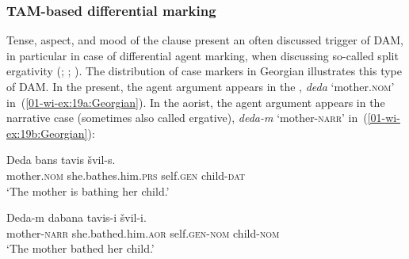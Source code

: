 \documentclass[output=paper]{LSP/langsci}
\begin{document}
\subsubsection{TAM-based differential marking}
\label{01-wi-sec:2.2.2-TAM-based}

Tense, aspect, and mood of the clause present an often discussed trigger of DAM, in particular in case of differential agent marking, when discussing so-called split ergativity (\cf \citealt{Comrie1978Ergativity}; \citealt[97--101]{Dixon1994Ergativity}; \citealt{deHoopetal2007Fluid}). 
The distribution of case markers in Georgian illustrates this type of DAM. 
In the present, the agent argument appears in the , \eg \textit{deda} ‘mother.\textsc{nom}’ in~(\ref{01-wi-ex:19a:Georgian}). 
In the aorist, the agent argument appears in the narrative case (sometimes also called ergative), \eg \textit{deda-m} ‘mother-\textsc{narr}’ in~(\ref{01-wi-ex:19b:Georgian}):

\ea\label{01-wi-ex:19:Georgian}
\begin{xlist}

\ex\label{01-wi-ex:19a:Georgian}
	\gll Deda		bans			tavis		švil-s.\\
	mother.\textsc{nom}	she.bathes.him.\textsc{prs}	self.\textsc{gen}	child-\textsc{dat}\\	
	\glt ‘The mother is bathing her child.’
	
\ex\label{01-wi-ex:19b:Georgian}
	\gll Deda-m		dabana		tavis-i			švil-i.\\
	mother-\textsc{narr}	she.bathed.him.\textsc{aor}	self.\textsc{gen}-\textsc{nom}	child-\textsc{nom}\\
	\glt ‘The mother bathed her child.’
\end{xlist}
\z
\end{document}

